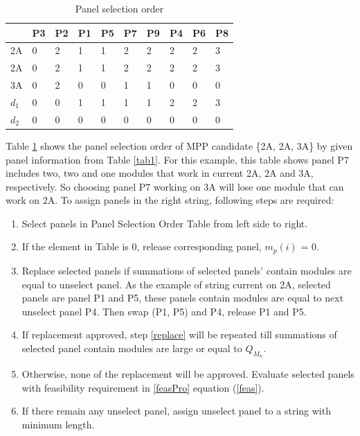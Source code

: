\documentclass[conference]{IEEEtran}
\begin{document}
\begin{table}[htbp] 
\caption{Panel selection order}
\begin{center}
\begin{tabular}{l|lllllllll}
        & P3 & P2 & P1 & P5 & P7 & P9 & P4 & P6 & P8 \\ \hline 
2A     & 0  & 2  & 1  & 1  & 2  & 2  & 2  & 2  & 3  \\
2A     & 0  & 2  & 1  & 1  & 2  & 2  & 2  & 2  & 3  \\
3A     & 0  & 2  & 0  & 0  & 1  & 1  & 0  & 0  & 0  \\
$d_1$ & 0  & 0  & 1  & 1  & 1  & 1  & 2  & 2  & 3  \\
$d_2$ & 0  & 0  & 0  & 0  & 0  & 0  & 0  & 0  & 0 
\end{tabular}\label{sorted}
\end{center}
\end{table}
Table \ref{sorted} shows the panel selection order of MPP candidate \{2A, 2A, 3A\} by given panel information from Table \ref{tab1}. For this example, this table shows panel P7 includes two, two and one modules that work in current 2A, 2A and 3A, respectively. So choosing panel P7 working on 3A will lose one module that can work on 2A.
To assign panels in the right string, following steps are required:
\begin{enumerate} [1-]
\item Select panels in Panel Selection Order Table from left side to right.
\item If the element in Table is 0, release corresponding panel, $m_p(i)$ = 0.
\item Replace selected panels if summations of selected panels' contain modules are equal to unselect panel. As the example of string current on 2A, selected panels are panel P1 and P5, these panels contain modules are equal to next unselect panel P4. Then swap (P1, P5) and P4, release P1 and P5. \label{replace}
\item If replacement approved, step \ref{replace} will be repeated till summations of selected panel contain modules are large or equal to \textit{$Q_{M_n}$}.
\item Otherwise, none of the replacement will be approved. Evaluate selected panels with feasibility requirement in \ref{feasPro} equation (\ref{feas}).
\item If there remain any unselect panel, assign unselect panel to a string with minimum length. 
\end{enumerate}
\end{document}

